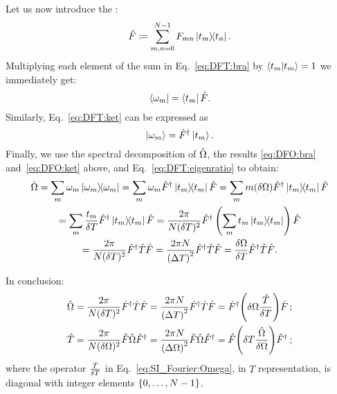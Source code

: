 Let us now introduce the : %
\begin{equation}
  \hat{F} \coloneqq \sum_{m,n=0}^{N-1} F_{mn} \ketbra{t_m}{t_n} \text{.}
\end{equation}
Multiplying each element of the sum in Eq.~\eqref{eq:DFT:bra}
by $\braket{t_m} = 1$
we immediately get:
\begin{equation}\label{eq:DFO:bra}
  \bra{\omega_{m}} =
  \bra{t_m} \hat{F} \text{.}
\end{equation}
Similarly, Eq.~\eqref{eq:DFT:ket} can be expressed as
\begin{equation}
  \label{eq:DFO:ket}  \ket{\omega_{m}} = \hat{F}^{\dagger} \ket{t_m} \text{.}
\end{equation}
%
Finally, we use the spectral decomposition of $\hat{\Omega}$,
the results \eqref{eq:DFO:bra} and~\eqref{eq:DFO:ket} above,
and Eq.~\eqref{eq:DFT:eigenratio}
to obtain:
\begin{multline}\label{eq:DFT:OmegaFTF}
  \hat{\Omega} = \sum_{m} \omega_{m} \ketbra{\omega_{m}} =
  \sum_{m} \omega_{m} \hat{F}^{\dagger} \ketbra{t_{m}} \hat{F} =
  \sum_{m} m \qty(\delta\Omega) \hat{F}^{\dagger} \ketbra{t_{m}} \hat{F}
  \\
  = \sum_{m} \frac{t_m}{\delta{T}} \hat{F}^{\dagger} \ketbra{t_{m}} \hat{F}
  = \frac{2\pi}{N(\delta{T})^{2}} \hat{F}^{\dagger} \left(\sum_{m}t_{m}\ketbra{t_{m}}\right) \hat{F}
  \\
  =
  \frac{2\pi}{N(\delta{T})^{2}} \hat{F}^{\dagger} \hat{T} \hat{F} =
  \frac{2\pi N}{\qty(\Delta T)^2} \hat{F}^{\dagger} \hat{T} \hat{F} = \frac{\delta\Omega}{\delta{T}} \hat{F}^{\dagger} \hat{T} \hat{F}
  \text{.}
\end{multline}

In conclusion:
\begin{gather}
  \label{eq:SI_Fourier:Omega}
    \hat{\Omega} =
      \frac{2\pi}{N(\delta T)^2}          \hat{F}^{\dagger} \hat{T} \hat{F} =
      \frac{2\pi N}{\qty(\Delta T)^2}     \hat{F}^{\dagger} \hat{T} \hat{F} =
      \hat{F}^{\dagger} \qty(\delta{\Omega} \frac{\hat{T}}{\delta{T}}) \hat{F}
      \, \text{;}
      \\
  \label{eq:SI_Fourier:T}
    \hat{T} =
      \frac{2\pi}{N(\delta\Omega)^2}      \hat{F} \hat{\Omega} \hat{F}^{\dagger} =
      \frac{2\pi N}{\qty(\Delta\Omega)^2} \hat{F} \hat{\Omega} \hat{F}^{\dagger} =
      \hat{F} \qty(\delta{T} \frac{\hat{\Omega}}{\delta{\Omega}}) \hat{F}^{\dagger}
      \, \text{;}
\end{gather}
where the operator $\frac{\hat{T}}{\delta{T}}$ in Eq.~\eqref{eq:SI_Fourier:Omega},
in $T$ representation, is diagonal with integer elements $\left\{0, \dots, N-1\right\}$.

